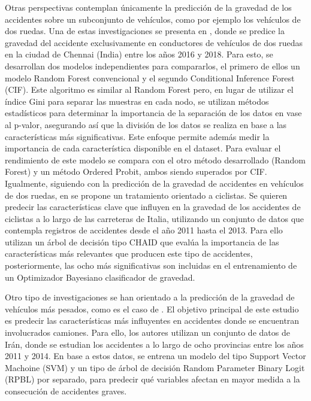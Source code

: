 \documentclass{uathesis-es}
\begin{document}
Otras perspectivas contemplan únicamente la predicción de la gravedad de los accidentes sobre un subconjunto de vehículos, como por ejemplo los vehículos de dos ruedas. Una de estas investigaciones se presenta en \cite{panicker2022injury}, donde se predice la gravedad del accidente exclusivamente en conductores de vehículos de dos ruedas en la ciudad de Chennai (India) entre los años 2016 y 2018. Para esto, se desarrollan dos modelos independientes para compararlos, el primero de ellos un modelo Random Forest convencional y  el segundo Conditional Inference Forest (CIF). Este algoritmo es similar al Random Forest pero, en lugar de utilizar el índice Gini para separar las muestras en cada nodo, se utilizan métodos estadísticos para determinar la importancia de la separación de los datos en vase al p-valor, asegurando así que la división de los datos se realiza en base a las características más significativas. Este enfoque permite además medir la importancia de cada característica disponible en el dataset. Para evaluar el rendimiento de este modelo se compara con el otro método desarrollado (Random Forest) y un método Ordered Probit, ambos siendo superados por CIF. Igualmente, siguiendo con la predicción de la gravedad de accidentes en vehículos de dos ruedas, en \cite{prati2017using} se propone un tratamiento orientado a ciclistas. Se quieren predecir las características clave que influyen en la gravedad de los accidentes de ciclistas a lo largo de las carreteras de Italia, utilizando un conjunto de datos que contempla registros de accidentes desde el año 2011 hasta el 2013. Para ello utilizan un árbol de decisión tipo CHAID que evalúa la importancia de las características más relevantes que producen este tipo de accidentes, posteriormente, las ocho más significativas son incluidas en el entrenamiento de un Optimizador Bayesiano clasificador de gravedad.

Otro tipo de investigaciones se han orientado a la predicción de la gravedad de vehículos más pesados, como es el caso de \cite{hosseinzadeh2021investigating}. El objetivo principal de este estudio es predecir las características más influyentes en accidentes donde se encuentran involucrados camiones. Para ello, los autores utilizan un conjunto de datos de Irán, donde se estudian los accidentes a lo largo de ocho provincias entre los años 2011 y 2014. En base a estos datos, se entrena un modelo del tipo Support Vector Machoine (SVM) y un tipo de árbol de decisión Random Parameter Binary Logit (RPBL) por separado, para predecir qué variables afectan en mayor medida a la consecución de accidentes graves. 
\end{document}
